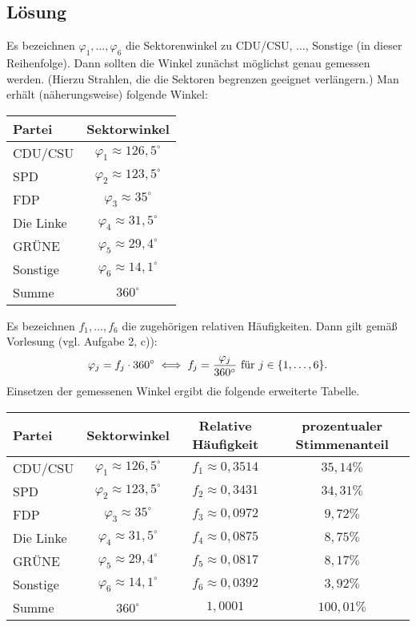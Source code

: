 \documentclass{exercise}
\begin{document}
    \subsection*{Lösung}
    Es bezeichnen \(\varphi_1, \ldots, \varphi_6\) die Sektorenwinkel zu CDU/CSU, \(\ldots\), Sonstige (in dieser Reihenfolge).
    Dann sollten die Winkel zunächst möglichst genau gemessen werden.
    (Hierzu Strahlen, die die Sektoren begrenzen geeignet verlängern.)
    Man erhält (näherungsweise) folgende Winkel:
    \begin{center}
        \begin{tabular}{lc}
            \toprule
            Partei & Sektorwinkel\\
            \midrule
            CDU/CSU & \(\varphi_1 \approx 126,5^\circ\)\\
            SPD & \(\varphi_2 \approx 123,5^\circ\)\\
            FDP & \(\varphi_3 \approx 35^\circ\)\\
            Die Linke & \(\varphi_4 \approx 31,5^\circ\)\\
            GRÜNE & \(\varphi_5 \approx 29,4^\circ\)\\
            Sonstige & \(\varphi_6 \approx 14,1^\circ\)\\
            \midrule
            Summe & \(360^\circ\)\\
            \bottomrule
        \end{tabular}
    \end{center}
    Es bezeichnen \(f_1, \ldots, f_6\) die zugehörigen relativen Häufigkeiten.
    Dann gilt gemäß Vorlesung (vgl. Aufgabe 2, c)):
    \[
        \varphi_j = f_j \cdot 360^\circ \iff f_j = \frac{\varphi_j}{360^\circ}\text{ für }j \in \braces*{1, \ldots, 6}.
    \]
    Einsetzen der gemessenen Winkel ergibt die folgende erweiterte Tabelle.
    \begin{center}
        \begin{tabular}{lccc}
            \toprule
            Partei & Sektorwinkel & Relative Häufigkeit & prozentualer Stimmenanteil\\
            \midrule
            CDU/CSU & \(\varphi_1 \approx 126,5^\circ\) & \(f_1 \approx 0,3514\) & \(35,14\%\)\\
            SPD & \(\varphi_2 \approx 123,5^\circ\) & \(f_2 \approx 0,3431\) & \(34,31\%\)\\
            FDP & \(\varphi_3 \approx 35^\circ\) & \(f_3 \approx 0,0972\) & \(9,72\%\)\\
            Die Linke & \(\varphi_4 \approx 31,5^\circ\) & \(f_4 \approx 0,0875\) & \(8,75\%\)\\
            GRÜNE & \(\varphi_5 \approx 29,4^\circ\) & \(f_5 \approx 0,0817\) & \(8,17\%\)\\
            Sonstige & \(\varphi_6 \approx 14,1^\circ\) & \(f_6 \approx 0,0392\) & \(3,92\%\)\\
            \midrule
            Summe & \(360^\circ\) & \(1,0001\) & \(100,01\%\)\\
            \bottomrule
        \end{tabular}
    \end{center}
\end{document}
